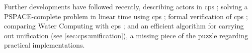 Further developments have followed recently, describing \Glspl{actor} in \gls{cps} \cite{Henderson2019};  solving a PSPACE-complete problem in linear time using \gls{cps} \cite{Henderson2020}; formal verification of \gls{cps} \cite{Liu2020,Liu2021a}; comparing Water Computing with \gls{cps} \cite{Henderson2021}; and an efficient algorithm for carrying out unification \cite{Liu2021} (see \cref{sec:cps:unification}), a missing piece of the puzzle regarding practical implementations.














